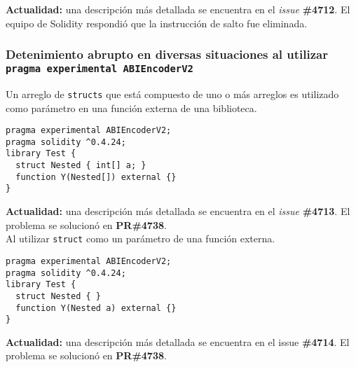 \textbf{Actualidad:} una descripción más detallada se encuentra en el \textit{issue} \textbf{\#4712}\cite{GHI4712}. El equipo de Solidity respondió que la instrucción de salto fue eliminada.\\

\subsubsection{Detenimiento abrupto en diversas situaciones al utilizar \texttt{pragma experimental ABIEncoderV2}}

Un arreglo de \texttt{structs} que está compuesto de uno o más arreglos es utilizado como parámetro en una función externa de una biblioteca.\\

\begin{lstlisting}[language=Solidity, caption={Código de ejemplo con \texttt{ABIEncoderV2}}]
pragma experimental ABIEncoderV2;
pragma solidity ^0.4.24;                                        
library Test {                                             
  struct Nested { int[] a; }                                              
  function Y(Nested[]) external {}                                          
}
\end{lstlisting}

\textbf{Actualidad:} una descripción más detallada se encuentra en el \textit{issue} \textbf{\#4713}\cite{GHI4713}. El problema se solucionó en \textbf{PR\#4738}\cite{GHPR4738}.\\

Al utilizar \texttt{struct} como un parámetro de una función externa.\\

\begin{lstlisting}[language=Solidity, caption={Código de ejemplo con \texttt{strcut} como parámetro externo}]
pragma experimental ABIEncoderV2;                          
pragma solidity ^0.4.24;                                                                        
library Test {                                             
  struct Nested { }                                        
  function Y(Nested a) external {}                         
}
\end{lstlisting}

\textbf{Actualidad:} una descripción más detallada se encuentra en el issue \textbf{\#4714}\cite{GHI4714}. El problema se solucionó en \textbf{PR\#4738}\cite{GHPR4738}.\\

